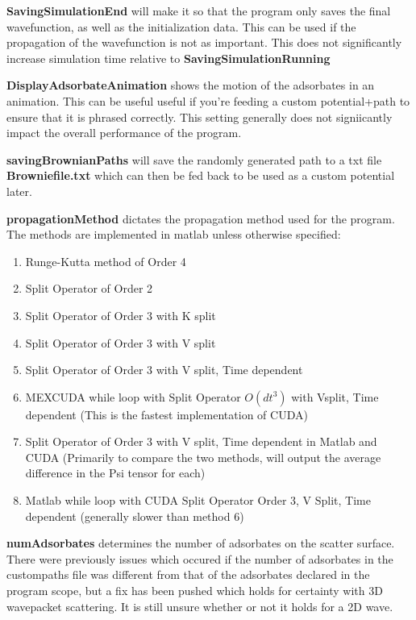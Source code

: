 \documentclass[11pt,letterpaper]{article}
\renewcommand{\\}{\bigskip}
\begin{document}
\textbf{SavingSimulationEnd} will make it so that the program only saves the final wavefunction, as well as the initialization data. This can be used if the propagation of the wavefunction is not as important. This does not significantly increase simulation time relative to \textbf{SavingSimulationRunning}\\

\textbf{DisplayAdsorbateAnimation} shows the motion of the adsorbates in an animation. This can be useful useful if you're feeding a custom potential+path to ensure that it is phrased correctly. This setting generally does not signiicantly impact the overall performance of the program.\\

\textbf{savingBrownianPaths} will save the randomly generated path to a txt file \textbf{Browniefile.txt} which can then be fed back to be used as a custom potential later.\\

\textbf{propagationMethod} dictates the propagation method used for the program. The methods are implemented in matlab unless otherwise specified:

\begin{enumerate}
    \item Runge-Kutta method of Order 4
    \item Split Operator of Order 2
    \item Split Operator of Order 3 with K split
    \item Split Operator of Order 3 with V split
    \item Split Operator of Order 3 with V split, Time dependent
    \item MEXCUDA while loop with Split Operator $O(dt^3)$ with Vsplit, Time dependent (This is the fastest implementation of CUDA)
    \item Split Operator of Order 3 with V split, Time dependent in Matlab and CUDA (Primarily to compare the two methods, will output the average difference in the Psi tensor for each)
    \item Matlab while loop with CUDA Split Operator Order 3, V Split, Time dependent (generally slower than method 6)
\end{enumerate}

\bigskip

\textbf{numAdsorbates} determines the number of adsorbates on the scatter surface. There were previously issues which occured if the number of adsorbates in the custompaths file was different from that of the adsorbates declared in the program scope, but a fix has been pushed which holds for certainty with 3D wavepacket scattering. It is still unsure whether or not it holds for a 2D wave. \\
\end{document}
